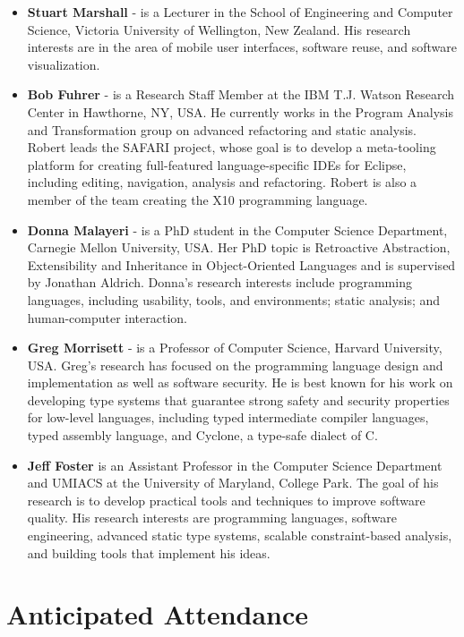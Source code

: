 \documentclass{acm_proc_article-sp}
\begin{document}
\begin{itemize}
\item \textbf{Stuart Marshall} - is a Lecturer in the School of Engineering and Computer Science, Victoria University of Wellington, New Zealand. His research interests are in the area of mobile user interfaces, software reuse, and software visualization.

\item \textbf{Bob Fuhrer} - is a Research Staff Member at the IBM T.J. Watson Research Center in Hawthorne, NY, USA. He currently works in the Program Analysis and Transformation group on advanced refactoring and static analysis. Robert leads the SAFARI project, whose goal is to develop a meta-tooling platform for creating full-featured language-specific IDEs for Eclipse, including editing, navigation, analysis and refactoring. Robert is also a member of the team creating the X10 programming language.

\item \textbf{Donna Malayeri} - is a PhD student in the Computer Science Department, Carnegie Mellon University, USA. Her PhD topic is Retroactive Abstraction, Extensibility and Inheritance in Object-Oriented Languages and is supervised by Jonathan Aldrich. Donna's research interests include programming languages, including usability, tools, and environments; static analysis;  and human-computer interaction. 

\item \textbf{Greg Morrisett} - is a Professor of Computer Science, Harvard University, USA. Greg's research has focused on the programming language design and implementation as well as software security.  He is best known for his work on developing type systems that guarantee strong safety and security properties for low-level languages, including typed intermediate compiler languages, typed assembly language, and Cyclone, a type-safe dialect of C.

\item \textbf{Jeff Foster} is an Assistant Professor in the Computer Science Department and UMIACS at the University of Maryland, College Park. The goal of his research is to develop practical tools and techniques to improve software quality. His research interests are programming languages, software engineering, advanced static type systems, scalable constraint-based analysis, and building tools that implement his ideas.

\end{itemize}

\section{Anticipated Attendance}
\end{document}
